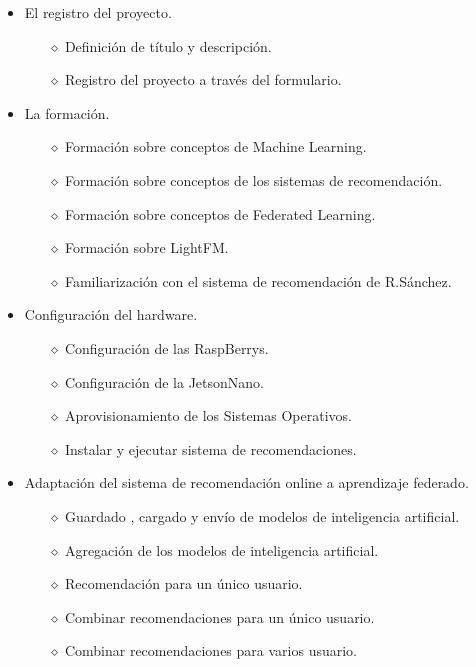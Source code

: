\begin{itemize}
    \item El registro del proyecto. 
        \begin{itemize}
            \item [$\diamond$]Definición de título y descripción.
            \item [$\diamond$]Registro del proyecto a través del formulario.
        \end{itemize}
    \item La formación.
        \begin{itemize}
            \item [$\diamond$]Formación sobre conceptos de Machine Learning.
            \item [$\diamond$]Formación sobre conceptos de los sistemas de recomendación.
            \item [$\diamond$]Formación sobre conceptos de Federated Learning.
            \item [$\diamond$]Formación sobre LightFM.
            \item [$\diamond$]Familiarización con el sistema de recomendación de R.Sánchez.
        \end{itemize}
    \item Configuración del hardware.
        \begin{itemize}
            \item [$\diamond$]Configuración de las RaspBerrys.
            \item [$\diamond$]Configuración de la JetsonNano.
            \item [$\diamond$]Aprovisionamiento de los Sistemas Operativos.
            \item [$\diamond$]Instalar y ejecutar sistema de recomendaciones.
        \end{itemize}
    \item Adaptación del sistema de recomendación online a aprendizaje federado.
        \begin{itemize}
            \item [$\diamond$]Guardado , cargado y envío de modelos de inteligencia artificial.
            \item [$\diamond$]Agregación de los modelos de inteligencia artificial.
            \item [$\diamond$]Recomendación para un único usuario.
            \item [$\diamond$]Combinar recomendaciones para un único usuario.
            \item [$\diamond$]Combinar recomendaciones para varios usuario.

\end{itemize}
\end{itemize}
